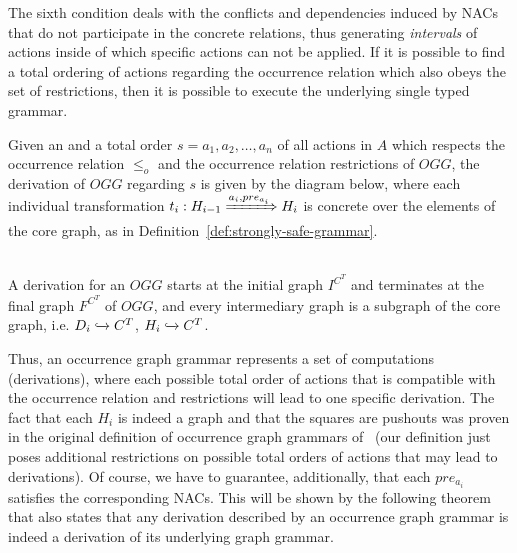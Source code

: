 
The sixth condition deals with the conflicts and dependencies induced by NACs that do not participate in the concrete relations, thus generating \emph{intervals} of actions inside of which specific actions can not be applied. If it is possible to find a total ordering of actions regarding the occurrence relation which also obeys the set of restrictions, then it is possible to execute the underlying single typed grammar.

\begin{definition} Given an \occurrenceGrammar{} and a total order $s = a_1,a_2,\ldots,a_n$ of all actions in $A$ which respects the occurrence relation $\leq_o$ and the occurrence relation restrictions of $OGG$, the derivation of $OGG$ regarding $s$ is given by the diagram below, where each individual transformation $t_i : H_{i-1} \xRightarrow{a_i, pre_{a_i}} H_i$ is concrete over the elements of the core graph, as in Definition~\ref{def:strongly-safe-grammar}.


\hfill\\

A derivation for an $OGG$ starts at the initial graph $I^{C^T}$ and terminates at the final graph $F^{C^T}$ of $OGG$, and every intermediary graph is a subgraph of the core graph, i.e. $D_i\xhookrightarrow{} C^T$, $H_i\xhookrightarrow{} C^T$.
\end{definition}

  Thus, an occurrence graph grammar represents a set of computations (derivations), where each possible total order of actions that is compatible with the occurrence relation and restrictions will lead to one specific derivation.
  The fact that each $H_i$ is indeed a graph and that the squares are pushouts was proven in the original definition of occurrence graph grammars of~\cite{Corradini1996} (our definition just poses additional restrictions on possible total orders of actions that may lead to derivations).
  Of course, we have to guarantee, additionally, that each $pre_{a_i}$ satisfies the corresponding NACs.
  This will be shown by the following theorem that also states that any derivation described by an occurrence graph grammar is indeed a derivation of its underlying graph grammar.

